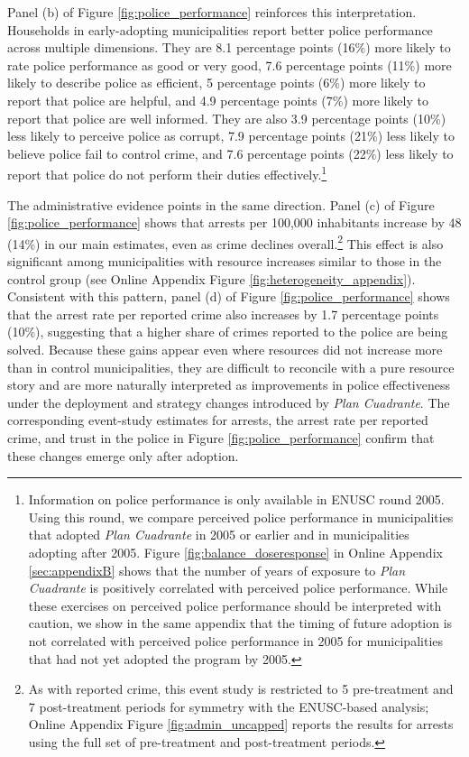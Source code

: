 Panel (b) of Figure \ref{fig:police_performance} reinforces this interpretation. Households in early-adopting municipalities report better police performance across multiple dimensions. They are 8.1 percentage points (16\%) more likely to rate police performance as good or very good, 7.6 percentage points (11\%) more likely to describe police as efficient, 5 percentage points (6\%) more likely to report that police are helpful, and 4.9 percentage points (7\%) more likely to report that police are well informed. They are also 3.9 percentage points (10\%) less likely to perceive police as corrupt, 7.9 percentage points (21\%) less likely to believe police fail to control crime, and 7.6 percentage points (22\%) less likely to report that police do not perform their duties effectively.\footnote{Information on police performance is only available in ENUSC round 2005. Using this round, we compare perceived police performance in municipalities that adopted \emph{Plan Cuadrante} in 2005 or earlier and in municipalities adopting after 2005. Figure \ref{fig:balance_doseresponse} in Online Appendix \ref{sec:appendixB} shows that the number of years of exposure to \emph{Plan Cuadrante} is positively correlated with perceived police performance. While these exercises on perceived police performance should be interpreted with caution, we show in the same appendix that the timing of future adoption is not correlated with perceived police performance in 2005 for municipalities that had not yet adopted the program by 2005.} %

The administrative evidence points in the same direction. Panel (c) of Figure \ref{fig:police_performance} shows that arrests per 100,000 inhabitants increase by 48 (14\%) in our main estimates, even as crime declines overall.\footnote{As with reported crime, this event study is restricted to 5 pre-treatment and 7 post-treatment periods for symmetry with the ENUSC-based analysis; Online Appendix Figure \ref{fig:admin_uncapped} reports the results for arrests using the full set of pre-treatment and post-treatment periods.} This effect is also significant among municipalities with resource increases similar to those in the control group (see Online Appendix Figure \ref{fig:heterogeneity_appendix}). Consistent with this pattern, panel (d) of Figure \ref{fig:police_performance} shows that the arrest rate per reported crime also increases by 1.7 percentage points (10\%), suggesting that a higher share of crimes reported to the police are being solved. Because these gains appear even where resources did not increase more than in control municipalities, they are difficult to reconcile with a pure resource story and are more naturally interpreted as improvements in police effectiveness under the deployment and strategy changes introduced by \emph{Plan Cuadrante}. The corresponding event-study estimates for arrests, the arrest rate per reported crime, and trust in the police in Figure \ref{fig:police_performance} confirm that these changes emerge only after adoption.

